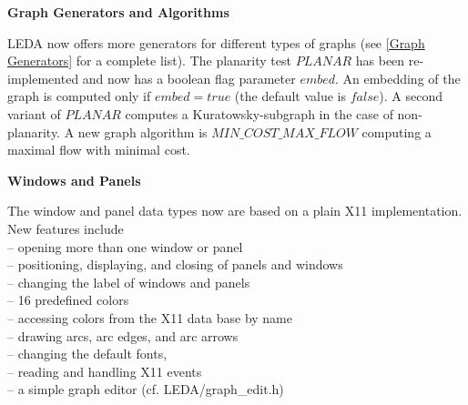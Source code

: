 \bigskip
{\bf Graph Generators and Algorithms}

LEDA now offers more generators for different types of graphs (see 
\ref{Graph Generators} for a complete list).
The planarity test $PLANAR$ has been re-implemented and
now has a boolean flag parameter $embed$. An embedding of the graph
is computed only if $embed = true$ (the default value is $false$). A second variant of $PLANAR$
computes a Kuratowsky-subgraph in the case of non-planarity.
A new graph algorithm is $MIN\_COST\_MAX\_FLOW$ computing
a maximal flow with minimal cost. 


\bigskip
{\bf Windows and Panels}

The window and panel data types  now are based on a plain X11 implementation.
New features include\\
-- opening more than one window or panel\\
-- positioning, displaying, and closing of panels and windows\\
-- changing the label of windows and panels\\
-- 16 predefined colors\\
-- accessing colors from the X11 data base by name\\
-- drawing arcs, arc edges, and arc arrows\\
-- changing the default fonts, \\
-- reading and handling X11 events\\
-- a simple graph editor (cf. \<LEDA/graph\_edit.h\>)\\

